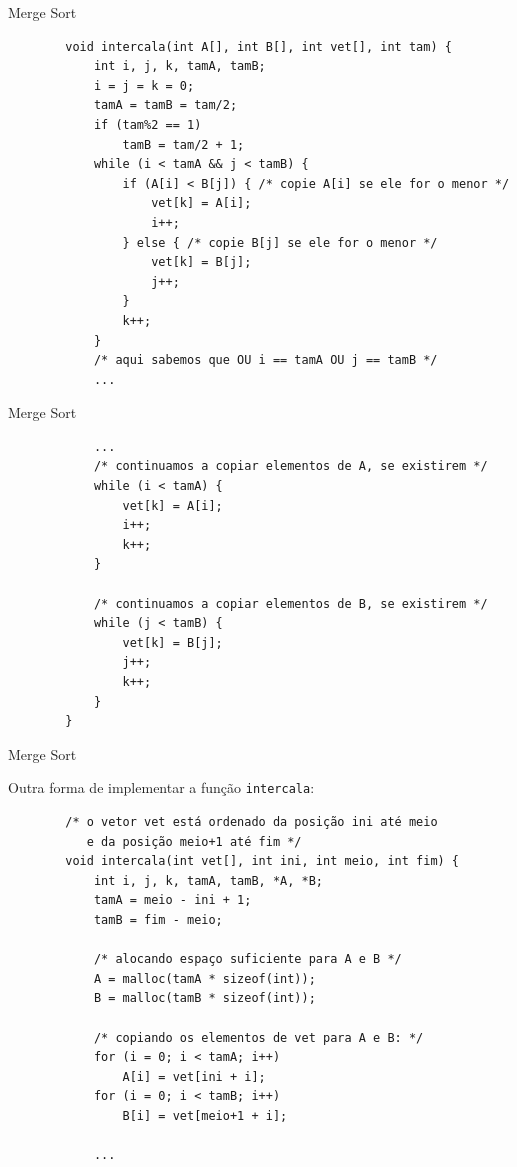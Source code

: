 \documentclass[handout]{beamer}
\newcommand{\cod}[1]{\texttt{#1}}
\begin{document}
\begin{frame}[fragile]{Merge Sort}

    \vspace{-1em}
    \begin{verbatim}
        void intercala(int A[], int B[], int vet[], int tam) {
            int i, j, k, tamA, tamB;
            i = j = k = 0;
            tamA = tamB = tam/2;
            if (tam%2 == 1)
                tamB = tam/2 + 1;
            while (i < tamA && j < tamB) {
                if (A[i] < B[j]) { /* copie A[i] se ele for o menor */
                    vet[k] = A[i];
                    i++;
                } else { /* copie B[j] se ele for o menor */
                    vet[k] = B[j];
                    j++;
                }
                k++;
            }
            /* aqui sabemos que OU i == tamA OU j == tamB */
            ...
    \end{verbatim}

\end{frame}

\begin{frame}[fragile]{Merge Sort}

    \vspace{-1em}
    \begin{verbatim}
            ...
            /* continuamos a copiar elementos de A, se existirem */
            while (i < tamA) {
                vet[k] = A[i];
                i++;
                k++;
            }
        
            /* continuamos a copiar elementos de B, se existirem */
            while (j < tamB) {
                vet[k] = B[j];
                j++;
                k++;
            }
        }
    \end{verbatim}

\end{frame}

\begin{frame}[fragile]{Merge Sort}

    Outra forma de implementar a função \cod{intercala}:
    \vspace{-1em}
    \begin{verbatim}
        /* o vetor vet está ordenado da posição ini até meio
           e da posição meio+1 até fim */
        void intercala(int vet[], int ini, int meio, int fim) {
            int i, j, k, tamA, tamB, *A, *B;
            tamA = meio - ini + 1;
            tamB = fim - meio;

            /* alocando espaço suficiente para A e B */
            A = malloc(tamA * sizeof(int));
            B = malloc(tamB * sizeof(int));

            /* copiando os elementos de vet para A e B: */
            for (i = 0; i < tamA; i++)
                A[i] = vet[ini + i];
            for (i = 0; i < tamB; i++)
                B[i] = vet[meio+1 + i];

            ...
    \end{verbatim}

\end{frame}
\end{document}
